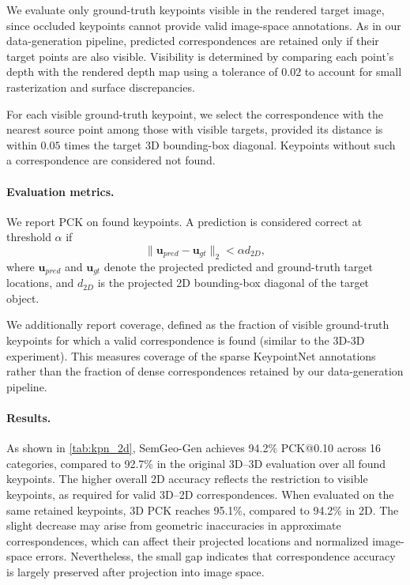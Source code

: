 We evaluate only ground-truth keypoints visible in the rendered
target image, since occluded keypoints cannot provide valid
image-space annotations. As in our data-generation pipeline,
predicted correspondences are retained only if their target
points are also visible. Visibility is determined by comparing
each point's depth with the rendered depth map using a tolerance
of $0.02$ to account for small rasterization and surface
discrepancies.

For each visible ground-truth keypoint, we select the
correspondence with the nearest source point among those
with visible targets, provided its distance is within
$0.05$ times the target 3D bounding-box diagonal.
Keypoints without such a correspondence are considered
not found.

\paragraph{Evaluation metrics.}
We report PCK on found keypoints. A prediction is considered
correct at threshold $\alpha$ if
\begin{equation}
    \|\mathbf{u}_{pred}-\mathbf{u}_{gt}\|_2
    < \alpha d_{2D},
\end{equation}
where $\mathbf{u}_{pred}$ and $\mathbf{u}_{gt}$ denote
the projected predicted and ground-truth target locations,
and $d_{2D}$ is the projected 2D bounding-box diagonal
of the target object.

We additionally report coverage, defined as the fraction
of visible ground-truth keypoints for which a valid
correspondence is found (similar to the 3D-3D experiment). This measures coverage of the
sparse KeypointNet annotations rather than the fraction
of dense correspondences retained by our data-generation
pipeline.

\paragraph{Results.}
As shown in \autoref{tab:kpn_2d}, SemGeo-Gen achieves
94.2\% PCK@0.10 across 16 categories, compared to
92.7\% in the original 3D--3D evaluation over all
found keypoints. The higher overall 2D accuracy reflects
the restriction to visible keypoints, as required for
valid 3D--2D correspondences. When evaluated on the
same retained keypoints, 3D PCK reaches 95.1\%, compared
to 94.2\% in 2D. The slight decrease may arise from
geometric inaccuracies in approximate correspondences,
which can affect their projected locations and normalized
image-space errors. Nevertheless, the small gap indicates
that correspondence accuracy is largely preserved after
projection into image space.

